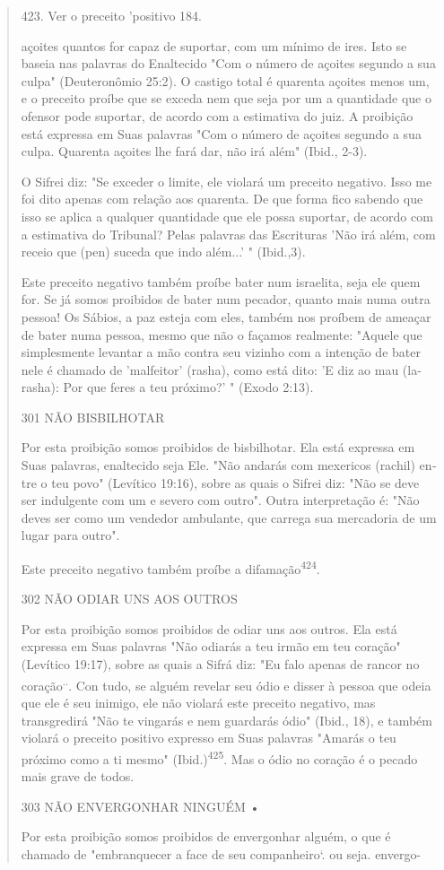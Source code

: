 \begin{quote}
423. Ver o preceito 'positivo 184.

açoites quantos for capaz de suportar, com um mínimo de ires. Isto se
baseia nas palavras do Enaltecido "Com o número de açoites segundo a sua
culpa" (Deuteronômio 25:2). O castigo total é quarenta açoites menos um,
e o precei­to proíbe que se exceda nem que seja por um a quantidade que
o ofensor pode suportar, de acordo com a estimativa do juiz. A proibição
está expressa em Suas palavras "Com o número de açoites segundo a sua
culpa. Quarenta açoites lhe fará dar, não irá além" (Ibid., 2-3).

O Sifrei diz: "Se exceder o limite, ele violará um preceito negativo.
Isso me foi dito apenas com relação aos quarenta. De que forma fico
sabendo que isso se aplica a qualquer quantidade que ele possa suportar,
de acordo com a estimativa do Tribunal? Pelas palavras das Escrituras
'Não irá além, com re­ceio que (pen) suceda que indo além...' "
(Ibid.,3).

Este preceito negativo também proíbe bater num israelita, seja ele quem
for. Se já somos proibidos de bater num pecador, quanto mais numa ou­tra
pessoa! Os Sábios, a paz esteja com eles, também nos proíbem de ameaçar
de bater numa pessoa, mesmo que não o façamos realmente: "Aquele que
sim­plesmente levantar a mão contra seu vizinho com a intenção de bater
nele é chamado de 'malfeitor' (rasha), como está dito: 'E diz ao mau
(la-rasha): Por que feres a teu próximo?' " (Exodo 2:13).

301 NÃO BISBILHOTAR

Por esta proibição somos proibidos de bisbilhotar. Ela está expressa em
Suas palavras, enaltecido seja Ele. "Não andarás com mexericos (rachil)
en­tre o teu povo" (Levítico 19:16), sobre as quais o Sifrei diz: "Não
se deve ser indulgente com um e severo com outro". Outra interpretação
é: "Não deves ser como um vendedor ambulante, que carrega sua mercadoria
de um lugar pa­ra outro".

Este preceito negativo também proíbe a difamação\textsuperscript{424}.

302 NÃO ODIAR UNS AOS OUTROS

Por esta proibição somos proibidos de odiar uns aos outros. Ela está
expressa em Suas palavras "Não odiarás a teu irmão em teu coração"
(Levítico 19:17), sobre as quais a Sifrá diz: "Eu falo apenas de rancor
no coração\textsuperscript{..}. Con tudo, se alguém revelar seu ódio e
disser à pessoa que odeia que ele é seu inimi­go, ele não violará este
preceito negativo, mas transgredirá "Não te vingarás e nem guardarás
ódio" (Ibid., 18), e também violará o preceito positivo expres­so em
Suas palavras "Amarás o teu próximo como a ti mesmo"
(Ibid.)\textsuperscript{425}. Mas o ódio no coração é o pecado mais
grave de todos.

303 NÃO ENVERGONHAR NINGUÉM •

Por esta proibição somos proibidos de envergonhar alguém, o que é
chamado de "embranquecer a face de seu companheiro`. ou seja. envergo-
\end{quote}


